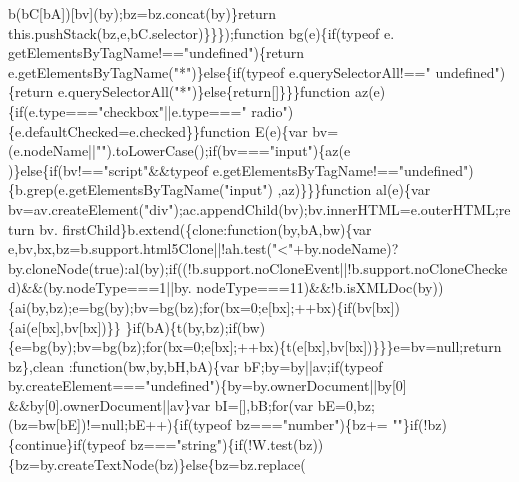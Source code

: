 \begin{DoxyCode}
      b(bC[bA])[bv](by);bz=bz.concat(by)\}\textcolor{keywordflow}{return} this.pushStack(bz,e,bC.selector)\}\}\});\textcolor{keyword}{function} bg(e)\{\textcolor{keywordflow}{if}(typeof e.
      getElementsByTagName!==\textcolor{stringliteral}{"undefined"})\{\textcolor{keywordflow}{return} e.getElementsByTagName(\textcolor{stringliteral}{"*"})\}\textcolor{keywordflow}{else}\{\textcolor{keywordflow}{if}(typeof e.querySelectorAll!==\textcolor{stringliteral}{"
      undefined"})\{\textcolor{keywordflow}{return} e.querySelectorAll(\textcolor{stringliteral}{"*"})\}\textcolor{keywordflow}{else}\{\textcolor{keywordflow}{return}[]\}\}\}\textcolor{keyword}{function} az(e)\{\textcolor{keywordflow}{if}(e.type===\textcolor{stringliteral}{"checkbox"}||e.type===\textcolor{stringliteral}{"
      radio"})\{e.defaultChecked=e.checked\}\}\textcolor{keyword}{function} E(e)\{var bv=(e.nodeName||\textcolor{stringliteral}{""}).toLowerCase();\textcolor{keywordflow}{if}(bv===\textcolor{stringliteral}{"input"})\{az(e
      )\}\textcolor{keywordflow}{else}\{\textcolor{keywordflow}{if}(bv!==\textcolor{stringliteral}{"script"}&&typeof e.getElementsByTagName!==\textcolor{stringliteral}{"undefined"})\{b.grep(e.getElementsByTagName(\textcolor{stringliteral}{"input"})
      ,az)\}\}\}\textcolor{keyword}{function} al(e)\{var bv=av.createElement(\textcolor{stringliteral}{"div"});ac.appendChild(bv);bv.innerHTML=e.outerHTML;\textcolor{keywordflow}{return} bv.
      firstChild\}b.extend(\{clone:\textcolor{keyword}{function}(by,bA,bw)\{var e,bv,bx,bz=b.support.html5Clone||!ah.test(\textcolor{stringliteral}{"<"}+by.nodeName)?
      by.cloneNode(\textcolor{keyword}{true}):al(by);\textcolor{keywordflow}{if}((!b.support.noCloneEvent||!b.support.noCloneChecked)&&(by.nodeType===1||by.
      nodeType===11)&&!b.isXMLDoc(by))\{ai(by,bz);e=bg(by);bv=bg(bz);\textcolor{keywordflow}{for}(bx=0;e[bx];++bx)\{\textcolor{keywordflow}{if}(bv[bx])\{ai(e[bx],bv[bx])\}\}
      \}\textcolor{keywordflow}{if}(bA)\{t(by,bz);\textcolor{keywordflow}{if}(bw)\{e=bg(by);bv=bg(bz);\textcolor{keywordflow}{for}(bx=0;e[bx];++bx)\{t(e[bx],bv[bx])\}\}\}e=bv=null;\textcolor{keywordflow}{return} bz\},clean
      :\textcolor{keyword}{function}(bw,by,bH,bA)\{var bF;by=by||av;\textcolor{keywordflow}{if}(typeof by.createElement===\textcolor{stringliteral}{"undefined"})\{by=by.ownerDocument||by[0]
      &&by[0].ownerDocument||av\}var bI=[],bB;\textcolor{keywordflow}{for}(var bE=0,bz;(bz=bw[bE])!=null;bE++)\{\textcolor{keywordflow}{if}(typeof bz===\textcolor{stringliteral}{"number"})\{bz+=\textcolor{stringliteral}{
      ""}\}\textcolor{keywordflow}{if}(!bz)\{\textcolor{keywordflow}{continue}\}\textcolor{keywordflow}{if}(typeof bz===\textcolor{stringliteral}{"string"})\{\textcolor{keywordflow}{if}(!W.test(bz))\{bz=by.createTextNode(bz)\}\textcolor{keywordflow}{else}\{bz=bz.replace(

\end{DoxyCode}
